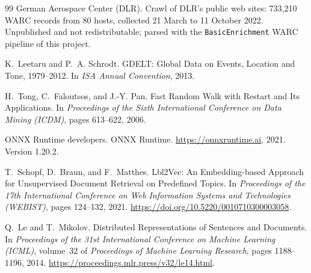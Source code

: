 \begin{thebibliography}{99}
German Aerospace Center (DLR).
\newblock Crawl of DLR's public web sites: 733{,}210 WARC records from 80 hosts, collected
21 March to 11 October 2022.
\newblock Unpublished and not redistributable; parsed with the \texttt{BasicEnrichment}
WARC pipeline of this project.

K.~Leetaru and P.~A. Schrodt.
\newblock GDELT: Global Data on Events, Location and Tone, 1979--2012.
\newblock In \emph{ISA Annual Convention}, 2013.

H.~Tong, C.~Faloutsos, and J.-Y. Pan.
\newblock Fast Random Walk with Restart and Its Applications.
\newblock In \emph{Proceedings of the Sixth International Conference on Data Mining (ICDM)},
pages 613--622, 2006.

ONNX Runtime developers.
\newblock ONNX Runtime.
\newblock \url{https://onnxruntime.ai}, 2021. Version 1.20.2.

T.~Schopf, D.~Braun, and F.~Matthes.
\newblock Lbl2Vec: An Embedding-based Approach for Unsupervised Document Retrieval on
Predefined Topics.
\newblock In \emph{Proceedings of the 17th International Conference on Web Information Systems
and Technologies (WEBIST)}, pages 124--132, 2021.
\url{https://doi.org/10.5220/0010710300003058}.

Q.~Le and T.~Mikolov.
\newblock Distributed Representations of Sentences and Documents.
\newblock In \emph{Proceedings of the 31st International Conference on Machine Learning
(ICML)}, volume~32 of \emph{Proceedings of Machine Learning Research}, pages 1188--1196, 2014.
\url{https://proceedings.mlr.press/v32/le14.html}.

\end{thebibliography}

